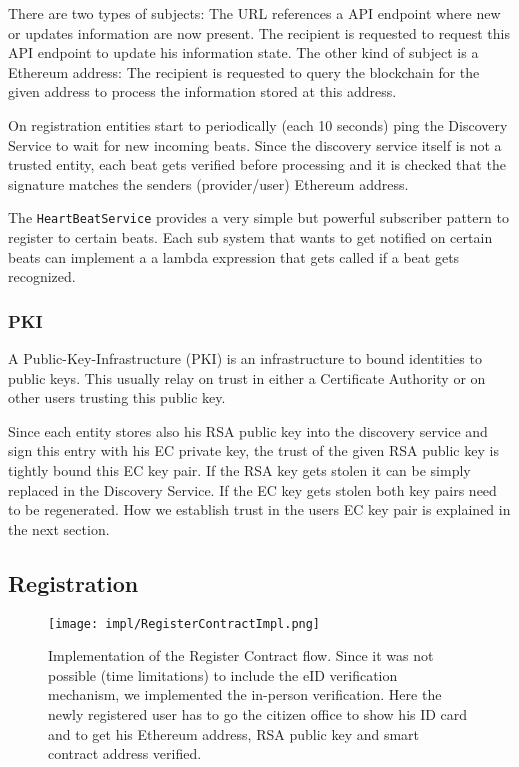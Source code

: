 There are two types of subjects: The URL references a API endpoint where new or updates information are now present. The recipient is requested to request this API endpoint to update his information state. The other kind of subject is a Ethereum address: The recipient is requested to query the blockchain for the given address to process the information stored at this address.

On registration entities start to periodically (each 10 seconds) ping the Discovery Service to wait for new incoming beats. Since the discovery service itself is not a trusted entity, each beat gets verified before processing and it is checked that the signature matches the senders (provider/user) Ethereum address.

The \lstinline{HeartBeatService} provides a very simple but powerful subscriber pattern to register to certain beats. Each sub system that wants to get notified on certain beats can implement a 
a lambda expression that gets called if a beat gets recognized. 

\subsubsection{PKI}
\label{sec:pki}

A Public-Key-Infrastructure (PKI) is an infrastructure to bound identities to public keys. This usually relay on trust in either a Certificate Authority or on other users trusting this public key. 

Since each entity stores also his RSA public key into the discovery service and sign this entry with his EC private key, the trust of the given RSA public key is tightly bound this EC key pair. If the RSA key gets stolen it can be simply replaced in the Discovery Service. If the EC key gets stolen both key pairs need to be regenerated. How we establish trust in the users EC key pair is explained in the next section.

\subsection{Registration}
\label{sec:registerContract}
\begin{figure}
\texttt{[image: impl/RegisterContractImpl.png]}
\centering
\caption{Implementation of the Register Contract flow. Since it was not possible (time limitations) to include the eID verification mechanism, we implemented the in-person verification. Here the newly registered user has to go the citizen office to show his ID card and to get his Ethereum address, RSA public key and smart contract address verified.}
\label{fig:registerContractImpl}
\end{figure}

